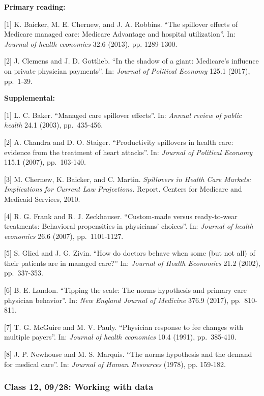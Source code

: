 \documentclass[11pt,]{article}
\begin{document}
\textbf{Primary reading:}

{[}1{]} K. Baicker, M. E. Chernew, and J. A. Robbins. ``The spillover
effects of Medicare managed care: Medicare Advantage and hospital
utilization''. In: \emph{Journal of health economics} 32.6 (2013), pp.
1289-1300.

{[}2{]} J. Clemens and J. D. Gottlieb. ``In the shadow of a giant:
Medicare's influence on private physician payments''. In: \emph{Journal
of Political Economy} 125.1 (2017), pp.~1-39.

\textbf{Supplemental:}

{[}1{]} L. C. Baker. ``Managed care spillover effects''. In:
\emph{Annual review of public health} 24.1 (2003), pp.~435-456.

{[}2{]} A. Chandra and D. O. Staiger. ``Productivity spillovers in
health care: evidence from the treatment of heart attacks''. In:
\emph{Journal of Political Economy} 115.1 (2007), pp.~103-140.

{[}3{]} M. Chernew, K. Baicker, and C. Martin. \emph{Spillovers in
Health Care Markets: Implications for Current Law Projections.} Report.
Centers for Medicare and Medicaid Services, 2010.

{[}4{]} R. G. Frank and R. J. Zeckhauser. ``Custom-made versus
ready-to-wear treatments: Behavioral propensities in physicians'
choices''. In: \emph{Journal of health economics} 26.6 (2007),
pp.~1101-1127.

{[}5{]} S. Glied and J. G. Zivin. ``How do doctors behave when some (but
not all) of their patients are in managed care?'' In: \emph{Journal of
Health Economics} 21.2 (2002), pp.~337-353.

{[}6{]} B. E. Landon. ``Tipping the scale: The norms hypothesis and
primary care physician behavior''. In: \emph{New England Journal of
Medicine} 376.9 (2017), pp.~810-811.

{[}7{]} T. G. McGuire and M. V. Pauly. ``Physician response to fee
changes with multiple payers''. In: \emph{Journal of health economics}
10.4 (1991), pp.~385-410.

{[}8{]} J. P. Newhouse and M. S. Marquis. ``The norms hypothesis and the
demand for medical care''. In: \emph{Journal of Human Resources} (1978),
pp. 159-182.

\hypertarget{class-12-0928-working-with-data}{%
\subsubsection{Class 12, 09/28: Working with
data}\label{class-12-0928-working-with-data}}
\end{document}
